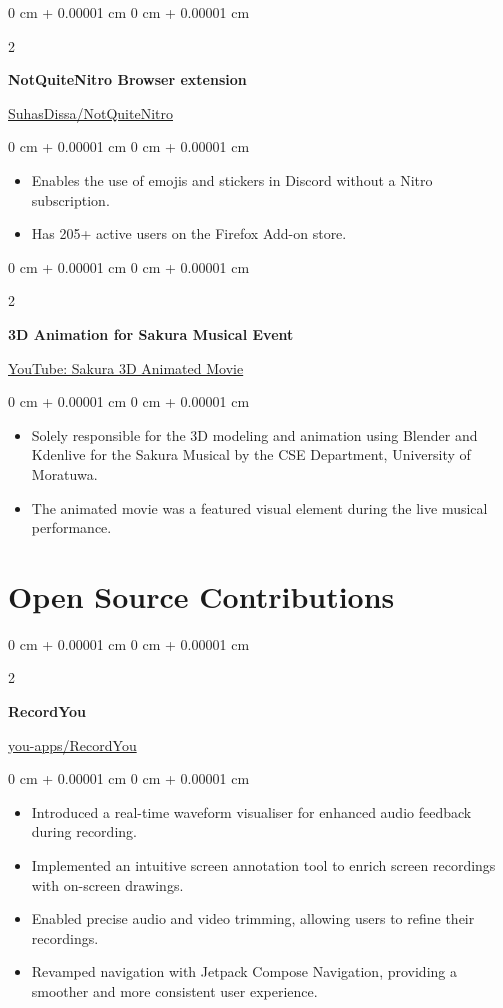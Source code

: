 \documentclass[10pt, letterpaper]{article}
\newenvironment{highlights}{
	\begin{itemize}[
		topsep=0.10 cm,
		parsep=0.10 cm,
		partopsep=0pt,
		itemsep=0pt,
		leftmargin=0 cm + 10pt
		]
	}{
	\end{itemize}
} %
\newenvironment{onecolentry}{
	\begin{adjustwidth}{
			0 cm + 0.00001 cm
		}{
			0 cm + 0.00001 cm
		}
	}{
	\end{adjustwidth}
} %
\newenvironment{twocolentry}[2][]{
	\onecolentry
	\def\secondColumn{#2}
	\setcolumnwidth{\fill, 4.5 cm}
	\begin{paracol}{2}
	}{
		\switchcolumn \raggedleft \secondColumn
	\end{paracol}
	\endonecolentry
} %
\begin{document}
	\begin{twocolentry}{\href{https://github.com/SuhasDissa/NotQuiteNitro}{SuhasDissa/NotQuiteNitro}}
		\textbf{NotQuiteNitro Browser extension}
	\end{twocolentry}
	\vspace{0.10 cm}
	\begin{onecolentry}
		\begin{highlights}
			\item Enables the use of emojis and stickers in Discord without a Nitro subscription.
			\item Has 205+ active users on the Firefox Add-on store.
		\end{highlights}
	\end{onecolentry}
	
	\vspace{0.2 cm}
	
	\begin{twocolentry}{\href{https://www.youtube.com/watch?v=appDAUeFnWI}{YouTube: Sakura 3D Animated Movie}}
		\textbf{3D Animation for Sakura Musical Event}
	\end{twocolentry}
	\vspace{0.10 cm}
	\begin{onecolentry}
		\begin{highlights}
			\item Solely responsible for the 3D modeling and animation using Blender and Kdenlive for the Sakura Musical by the CSE Department, University of Moratuwa.
			\item The animated movie was a featured visual element during the live musical performance.
		\end{highlights}
	\end{onecolentry}
	
	\section{Open Source Contributions}
		\begin{twocolentry}{\href{https://github.com/you-apps/RecordYou}{you-apps/RecordYou}}
		\textbf{RecordYou}
	\end{twocolentry}
	\vspace{0.10 cm}
	\begin{onecolentry}
		\begin{highlights}
			\item Introduced a real-time waveform visualiser for enhanced audio feedback during recording.
			\item Implemented an intuitive screen annotation tool to enrich screen recordings with on-screen drawings.
			\item Enabled precise audio and video trimming, allowing users to refine their recordings.
			\item Revamped navigation with Jetpack Compose Navigation, providing a smoother and more consistent user experience.
		\end{highlights}
	\end{onecolentry}
	
\end{document}
